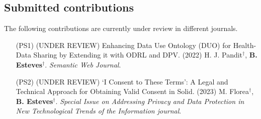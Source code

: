\subsection{Submitted contributions}
\label{sec:publications_submitted}

The following contributions are currently under review in different journals.

\begin{enumerate}
    \item [(PS1)] (UNDER REVIEW) Enhancing Data Use Ontology (DUO) for Health-Data Sharing by Extending it with ODRL and DPV. (2022) H. J. Pandit$^{\dagger}$, \textbf{B. Esteves}$^{\dagger}$.  \textit{Semantic Web Journal}.
    \item [(PS2)] (UNDER REVIEW) `I Consent to These Terms': A Legal and Technical Approach for Obtaining Valid Consent in Solid. (2023) M. Florea$^{\dagger}$, \textbf{B. Esteves}$^{\dagger}$. \textit{Special Issue on Addressing Privacy and Data Protection in New Technological Trends of the Information journal}.
\end{enumerate}